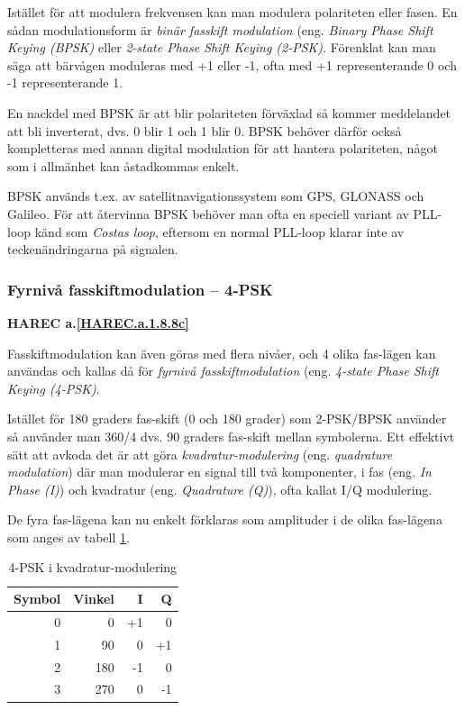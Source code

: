 Istället för att modulera frekvensen kan man modulera polariteten eller fasen.
En sådan modulationsform är \emph{binär fasskift modulation} (eng.
\emph{Binary Phase Shift Keying (BPSK)} eller \emph{2-state Phase Shift Keying
(2-PSK)}. Förenklat kan man säga att bärvågen moduleras med +1 eller -1,
ofta med +1 representerande 0 och -1 representerande 1.

En nackdel med BPSK är att blir polariteten förväxlad så kommer meddelandet
att bli inverterat, dvs. 0 blir 1 och 1 blir 0. BPSK behöver därför också
kompletteras med annan digital modulation för att hantera polariteten, något
som i allmänhet kan åstadkommas enkelt.

BPSK används t.ex. av satellitnavigationssystem som GPS, GLONASS och Galileo.
För att återvinna BPSK behöver man ofta en speciell variant av PLL-loop känd
som \emph{Costas loop}, eftersom en normal PLL-loop klarar inte av
teckenändringarna på signalen.

\subsubsection{Fyrnivå fasskiftmodulation -- 4-PSK}
\textbf{HAREC a.\ref{HAREC.a.1.8.8c}\label{myHAREC.a.1.8.8c}}

Fasskiftmodulation kan även göras med flera nivåer, och 4 olika fas-lägen
kan användas och kallas då för \emph{fyrnivå fasskiftmodulation} (eng.
\emph{4-state Phase Shift Keying (4-PSK)}.

Istället för 180 graders fas-skift (0 och 180 grader) som 2-PSK/BPSK använder
så använder man 360/4 dvs. 90 graders fas-skift mellan symbolerna.
Ett effektivt sätt att avkoda det är att göra \emph{kvadratur-modulering}
(eng. \emph{quadrature modulation}) där man modulerar en signal till två
komponenter, i fas (eng. \emph{In Phase (I)}) och kvadratur (eng.
\emph{Quadrature (Q)}), ofta kallat I/Q modulering.

De fyra fas-lägena kan nu enkelt förklaras som amplituder i de olika fas-lägena
som anges av tabell \ref{tab:4-PSK}.

\begin{table}[ht]
\begin{center}
\begin{tabular}{|r|r|r|r|}
\hline
Symbol & Vinkel & I & Q \\ \hline
0 &   0 & +1 &  0 \\
1 &  90 &  0 & +1 \\
2 & 180 & -1 &  0 \\
3 & 270 &  0 & -1 \\ \hline
\end{tabular}
\end{center}
\caption{4-PSK i kvadratur-modulering}
\label{tab:4-PSK}
\end{table}

